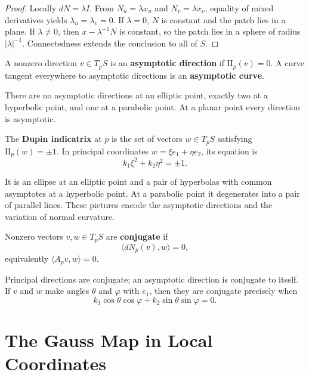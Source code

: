 \documentclass[12pt, oneside]{book}
\begin{document}
\begin{proof}
    Locally $dN=\lambda I$.  From $N_u=\lambda x_u$ and
    $N_v=\lambda x_v$, equality of mixed derivatives yields
    $\lambda_u=\lambda_v=0$.  If $\lambda=0$, $N$ is constant and the patch
    lies in a plane.  If $\lambda\neq0$, then
    $x-\lambda^{-1}N$ is constant, so the patch lies in a sphere of radius
    $|\lambda|^{-1}$.  Connectedness extends the conclusion to all of $S$.
\end{proof}

\begin{definition}
    A nonzero direction $v\in T_pS$ is an \textbf{asymptotic direction} if
    $\mathrm{II}_p(v)=0$.  A curve tangent everywhere to asymptotic directions
    is an \textbf{asymptotic curve}.
\end{definition}

There are no asymptotic directions at an elliptic point, exactly two at a
hyperbolic point, and one at a parabolic point.  At a planar point every
direction is asymptotic.

\begin{definition}
    The \textbf{Dupin indicatrix} at $p$ is the set of vectors $w\in T_pS$
    satisfying $\mathrm{II}_p(w)=\pm1$.  In principal coordinates
    $w=\xi e_1+\eta e_2$, its equation is
    \[
        k_1\xi^2+k_2\eta^2=\pm1.
    \]
\end{definition}

It is an ellipse at an elliptic point and a pair of hyperbolas with common
asymptotes at a hyperbolic point.  At a parabolic point it degenerates into a
pair of parallel lines.  These pictures encode the asymptotic directions and
the variation of normal curvature.

\begin{definition}
    Nonzero vectors $v,w\in T_pS$ are \textbf{conjugate} if
    \[
        \langle dN_p(v),w\rangle=0,
    \]
    equivalently $\langle A_pv,w\rangle=0$.
\end{definition}

Principal directions are conjugate; an asymptotic direction is conjugate to
itself.  If $v$ and $w$ make angles $\theta$ and $\varphi$ with $e_1$, then
they are conjugate precisely when
\[
    k_1\cos\theta\cos\varphi
    +k_2\sin\theta\sin\varphi=0.
\]

\section{The Gauss Map in Local Coordinates}
\end{document}
